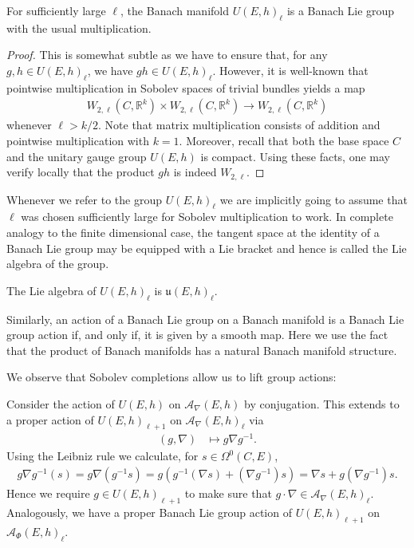 \documentclass[12pt]{ociamthesis}  %
\begin{document}
\begin{example}\label{ex:unitary_banach_lie_group}
  For sufficiently large $\ell$, the Banach manifold $U(E,h)_\ell$ is a
  Banach Lie group with the usual multiplication.
  \begin{proof}
    This is somewhat subtle as we have to ensure that, for any
    $g,h\in U(E,h)_\ell$, we have $gh\in U(E,h)_\ell$. However, it
    is well-known that pointwise multiplication
    in Sobolev spaces of trivial bundles yields a map
    \begin{align*}
      W_{2,\ell}(C,\mathbb R^k) \times
      W_{2,\ell}(C,\mathbb R^k) \to
      W_{2,\ell}(C,\mathbb R^k)
    \end{align*}
    whenever $\ell > k/2$. \cite[Theorem 6.1]{behzadan2021}
    Note that matrix multiplication consists of addition and
    pointwise multiplication with $k=1$. Moreover, recall that both
    the base space $C$ and the unitary gauge group $U(E,h)$ is compact.
    Using these facts, one may verify locally that the product $gh$ is indeed $W_{2,\ell}$.
  \end{proof}
\end{example}

Whenever we refer to the group $U(E,h)_\ell$ we are implicitly going to
assume that $\ell$ was chosen sufficiently large for Sobolev multiplication
to work.
In complete analogy to the finite dimensional case, the tangent space
at the identity of a Banach Lie group may be equipped with a Lie bracket
and hence is called the Lie algebra of the group.

\begin{example}
  The Lie algebra of $U(E,h)_\ell$ is $\mathfrak u(E,h)_\ell$.
\end{example}

Similarly, an action of a Banach Lie group on a Banach manifold
is a Banach Lie group action if, and only if, it is given by a
smooth map. Here we use the fact that the product of Banach manifolds
has a natural Banach manifold structure.

We observe that Sobolev completions allow us to lift group
actions:

\begin{example}
  Consider the action of $U(E,h)$ on $\mathcal A_\nabla(E,h)$
  by conjugation. This extends to a proper action of $U(E,h)_{\ell+1}$
  on $\mathcal A_\nabla(E,h)_\ell$ via
  \begin{align*}
    (g,\nabla) & \mapsto g\nabla g^{-1}.
  \end{align*}
  Using the Leibniz rule we calculate, for $s\in\Omega^0(C,E)$,
  \begin{align*}
    g\nabla g^{-1}(s) = g\nabla(g^{-1}s) = g(g^{-1}(\nabla s) + (\nabla g^{-1})s)
    = \nabla s + g(\nabla g^{-1})s.
  \end{align*}
  Hence we require $g\in U(E,h)_{\ell + 1}$ to make sure that $g\cdot\nabla\in \mathcal A_\nabla(E,h)_\ell$.
  Analogously, we have a proper Banach Lie group action of $U(E,h)_{\ell+1}$
  on $\mathcal A_\Phi (E,h)_\ell$.
\end{example}
\end{document}
